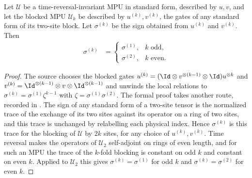 \begin{theorem}
    \label{prop:sigma1-and-sigma2-equal}
    \leanok
    Let $\mathcal U$ be a time-reversal-invariant MPU in standard form,
    described by $u,v$, and let the blocked MPU $\mathcal U_k$ be described by
    $u^{(k)},v^{(k)}$, the gates of any standard form of its two-site block.
    Let $\sigma^{(k)}$ be the sign obtained from $u^{(k)}$ and $v^{(k)}$. Then
    \begin{align}
        \sigma^{(k)}
         & =\begin{cases}
                \sigma^{(1)}, & k\text{ odd},  \\
                \sigma^{(2)}, & k\text{ even}.
            \end{cases}
    \end{align}
\end{theorem}

\begin{proof}\leanok
    The source chooses the blocked gates
    $u^{(k)}=(\Id\otimes v^{\otimes(k-1)}\otimes\Id)u^{\otimes k}$ and
    $v^{(k)}=\Id^{\otimes(k-1)}\otimes v\otimes\Id^{\otimes(k-1)}$ and unwinds
    the local relations to $\sigma^{(k)}=\sigma^{(1)}\zeta^{k-1}$ with
    $\zeta=\sigma^{(1)}\sigma^{(2)}$. The formal proof takes another route,
    recorded in \cite{gap:mpu_time_reversal_blocking_parity_route}. The sign of
    any standard form of a two-site tensor is the normalized trace of the
    exchange of its two sites against its operator on a ring of two sites,
    and this trace is unchanged by relabelling each physical index. Hence
    $\sigma^{(k)}$ is this trace for the blocking of $\mathcal U$ by $2k$
    sites, for any choice of $u^{(k)},v^{(k)}$. Time reversal makes the
    operators of $\mathcal U_2$ self-adjoint on rings of even length, and for
    such an MPU the trace of the $k$-fold blocking is constant on odd $k$ and
    constant on even $k$. Applied to $\mathcal U_2$ this gives
    $\sigma^{(k)}=\sigma^{(1)}$ for odd $k$ and $\sigma^{(k)}=\sigma^{(2)}$
    for even $k$.
\end{proof}

